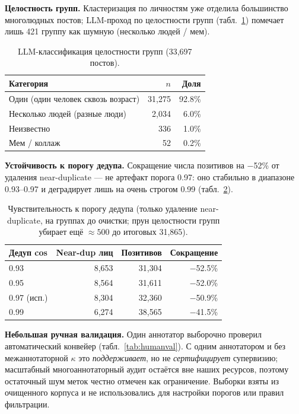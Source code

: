\documentclass[10pt,twocolumn,letterpaper]{article}
\begin{document}
\textbf{Целостность групп.} Кластеризация по личностям уже отделила большинство многолюдных постов;
LLM-проход по целостности групп (табл.~\ref{tab:integrity}) помечает лишь 421 группу как шумную
(несколько людей / мем).

\begin{table}[t]
\centering
\small
\begin{tabular}{@{}lrr@{}}
\toprule
Категория & $n$ & Доля \\
\midrule
Один (один человек сквозь возраст) & 31{,}275 & 92.8\% \\
Несколько людей (разные люди) & 2{,}034 & 6.0\% \\
Неизвестно & 336 & 1.0\% \\
Мем / коллаж & 52 & 0.2\% \\
\bottomrule
\end{tabular}
\caption{LLM-классификация целостности групп (33{,}697 постов).}
\label{tab:integrity}
\end{table}

\textbf{Устойчивость к порогу дедупа.} Сокращение числа позитивов на $-$52\% от удаления near-duplicate —
не артефакт порога 0.97: оно стабильно в диапазоне 0.93--0.97 и деградирует лишь на очень строгом 0.99
(табл.~\ref{tab:dedupsens}).

\begin{table}[t]
\centering
\small
\begin{tabular}{@{}lrrr@{}}
\toprule
Дедуп cos & Near-dup лиц & Позитивов & Сокращение \\
\midrule
0.93 & 8{,}653 & 31{,}304 & $-$52.5\% \\
0.95 & 8{,}564 & 31{,}611 & $-$52.0\% \\
0.97 (исп.) & 8{,}304 & 32{,}360 & $-$50.9\% \\
0.99 & 6{,}274 & 38{,}565 & $-$41.5\% \\
\bottomrule
\end{tabular}
\caption{Чувствительность к порогу дедупа (только удаление near-duplicate, на группах до очистки; прун
целостности групп убирает ещё ${\approx}500$ до итоговых 31{,}865).}
\label{tab:dedupsens}
\end{table}

\textbf{Небольшая ручная валидация.} Один аннотатор выборочно проверил автоматический конвейер
(табл.~\ref{tab:humanval}). С одним аннотатором и без межаннотаторной $\kappa$ это \emph{поддерживает},
но не \emph{сертифицирует} супервизию; масштабный многоаннотаторный аудит остаётся вне наших ресурсов,
поэтому остаточный шум меток честно отмечен как ограничение. Выборки взяты из очищенного корпуса и не
использовались для настройки порогов или правил фильтрации.
\end{document}
